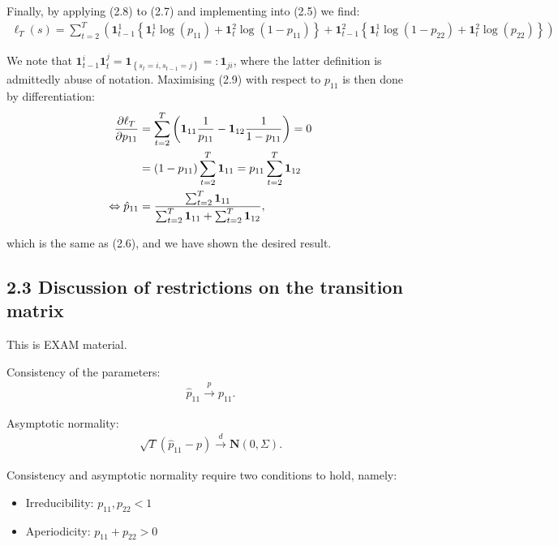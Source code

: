 \documentclass[11pt,a4paper,oneside]{article}
\newcommand{\LL}{\Leftrightarrow}
\newcommand{\lp}{\left(}
\newcommand{\rp}{\right)}
\newcommand{\lc}{\left\{}
\newcommand{\rc}{\right\}}
\newcommand{\nn}{\mathbf{N}}
\newcommand{\ii}{\mathbf{1}}
\begin{document}
Finally, by applying (2.8) to (2.7) and implementing into (2.5) we find:
\begin{align}
    \ell_T\lp s\rp = 
        \sum_{t=2}^T
        \lp 
            \ii_{t-1}^1
            \lc 
                \ii_t^1 \log \lp p_{11}\rp
                + 
                \ii_t^2 \log \lp 1 - p_{11}\rp
            \rc 
            + 
            \ii_{t-1}^2
            \lc 
                \ii_t^1 \log \lp 1 - p_{22}\rp 
                +
                \ii_t^2 \log \lp p_{22}\rp 
            \rc
        \rp
\end{align}

We note that $\ii_{t-1}^i \ii_{t}^j = \ii_{\lc s_t = i, s_{t-1} = j\rc} =: \ii_{ji}$, where the latter definition is admittedly abuse of notation. Maximising (2.9) with respect to $p_11$ is then done by differentiation:
\begin{align}
    \frac{\partial \ell_T}{\partial p_{11}} 
        &= \sum_{t=2}^T
            \lp
                \ii_{11} \frac{1}{p_{11}}
                -
                \ii_{12} \frac{1}{1 - p_{11}} 
            \rp
        = 0 \notag \\
        &= \lp 1 - p_{11}\rp \sum_{t=2}^T \ii_{11} = p_{11} \sum_{t=2}^T \ii_{12} \notag \\
    \LL
    \hat p_{11}
        &= \frac{\sum_{t=2}^T \ii_{11}}{\sum_{t=2}^T \ii_{11} + \sum_{t=2}^T \ii_{12}},
\end{align}

which is the same as (2.6), and we have shown the desired result.

\subsection{2.3 Discussion of restrictions on the transition matrix}
This is EXAM material.

Consistency of the parameters:
\begin{align}
    \hat p_{11} \overset{p}{\rightarrow} p_{11}.
\end{align}

Asymptotic normality:
\begin{align}
    \sqrt{T}\lp \hat p_{11} - p \rp \overset{d}{\rightarrow} \nn\lp 0, \Sigma\rp.
\end{align}

Consistency and asymptotic normality require two conditions to hold, namely:
\begin{itemize}
    \item Irreducibility: $p_{11}, p_{22} < 1$
    \item Aperiodicity: $p_11 + p_22 > 0$
\end{itemize}
\end{document}
